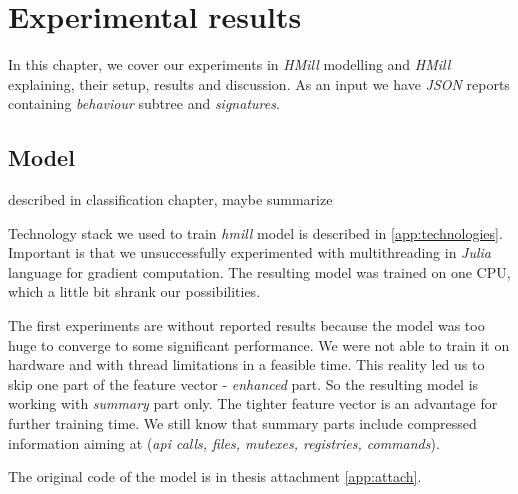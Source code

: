 \chapter{Experimental results} \label{chap:results}
In this chapter, we cover our experiments in \emph{HMill} modelling and \emph{HMill} explaining, their setup, results and discussion. As an input we have \emph{JSON} reports containing \emph{behaviour} subtree and \emph{signatures}.


\section{Model}
described in classification chapter, maybe summarize

Technology stack we used to train \emph{hmill} model is described in \ref{app:technologies}. Important is that we unsuccessfully experimented with multithreading in \emph{Julia} language for gradient computation. The resulting model was trained on one CPU, which a little bit shrank our possibilities.

The first experiments are without reported results because the model was too huge to converge to some significant performance. We were not able to train it on hardware and with thread limitations in a feasible time. This reality led us to skip one part of the feature vector - \emph{enhanced} part. So the resulting model is working with \emph{summary} part only. The tighter feature vector is an advantage for further training time. We still know that summary parts include compressed information aiming at (\emph{api calls, files, mutexes, registries, commands}).

The original code of the model is in thesis attachment \ref{app:attach}.



